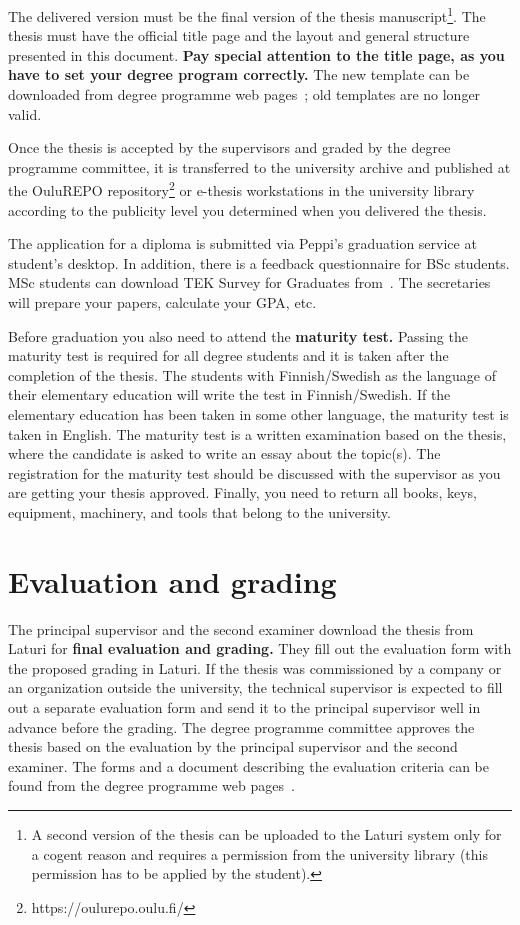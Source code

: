 The delivered version must be the final version of the thesis manuscript\footnote{A second version of the thesis can be uploaded to the Laturi system only for a cogent reason and requires a permission from the university library (this permission has to be applied by the student).}. The thesis must have the official title page and the layout and general structure presented in this document. \textbf{Pay special attention to the title page, as you have to set your degree program correctly.} The new template can be downloaded from degree programme web pages~\cite{mscstudies}; old templates are no longer valid.

Once the thesis is accepted by the supervisors and graded by the degree programme committee, it is transferred to the university archive and published at the OuluREPO repository\footnote{https://oulurepo.oulu.fi/} or e-thesis workstations in the university library according to the publicity level you determined when you delivered the thesis.

The application for a diploma is submitted via Peppi's graduation service at student's desktop. In addition, there is a feedback questionnaire for BSc students. MSc students can download TEK Survey for Graduates from~\cite{mscgraduation}. The secretaries will prepare your papers, calculate your GPA, etc. 

Before graduation you also need to attend the \textbf{maturity test.} Passing the maturity test is required for all degree students and it is taken after the completion of the thesis. The students with Finnish/Swedish as the language of their elementary education will write the test in Finnish/Swedish. If the elementary education has been taken in some other language, the maturity test is taken in English. The maturity test is a written examination based on the thesis, where the candidate is asked to write an essay about the topic(s). The registration for the maturity test should be discussed with the supervisor as you are getting your thesis approved. Finally, you need to return all books, keys, equipment, machinery, and tools that belong to the university.

\section{Evaluation and grading}

The principal supervisor and the second examiner download the thesis from Laturi for \textbf{final evaluation and grading.} They fill out the evaluation form with the proposed grading in Laturi. If the thesis was commissioned by a company or an organization outside the university, the technical supervisor is expected to fill out a separate evaluation form and send it to the principal supervisor well in advance before the grading. The degree programme committee approves the thesis based on the evaluation by the principal supervisor and the second examiner. The forms and a document describing the evaluation criteria can be found from the degree programme web pages~\cite{mscstudies}.

